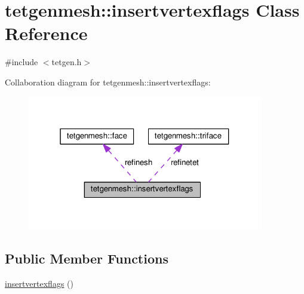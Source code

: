 \hypertarget{classtetgenmesh_1_1insertvertexflags}{}\section{tetgenmesh\+:\+:insertvertexflags Class Reference}
\label{classtetgenmesh_1_1insertvertexflags}


{\ttfamily \#include $<$tetgen.\+h$>$}



Collaboration diagram for tetgenmesh\+:\+:insertvertexflags\+:
\nopagebreak
\begin{figure}[H]
\begin{center}
\leavevmode
\includegraphics[width=292pt]{classtetgenmesh_1_1insertvertexflags__coll__graph}
\end{center}
\end{figure}
\subsection*{Public Member Functions}
\begin{DoxyCompactItemize}
\item 
\hyperlink{classtetgenmesh_1_1insertvertexflags_af7e418fe9c850fd55757152189e8c6ee}{insertvertexflags} ()
\end{DoxyCompactItemize}
